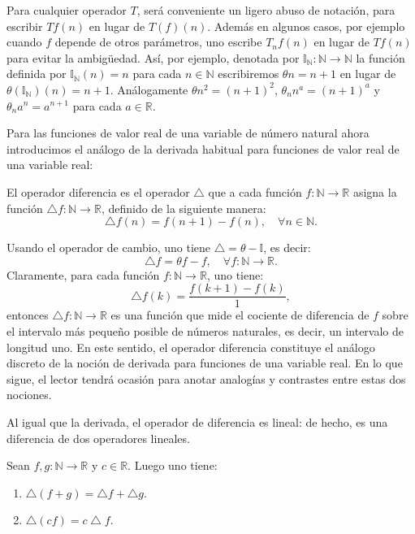 Para cualquier operador $T$, será conveniente un ligero abuso de notación, para escribir $Tf(n)$ en lugar de $T(f)(n)$. Además en algunos casos, por ejemplo cuando $f$ depende de otros parámetros, uno escribe $T_{n}f(n)$ en lugar de $Tf(n)$ para evitar la ambigüedad. Así, por ejemplo, denotada por $\mathds{I}_{\mathds{N}}\colon\mathds{N}\rightarrow\mathds{N}$ la función definida por $\mathds{I}_{\mathds{N}}(n)=n$ para cada $n\in\mathds{N} $ escribiremos $\theta n=n+1$ en lugar de $\theta(\mathds{I}_{\mathds{N}})(n)=n+1$. Análogamente $\theta n^{2}=(n+1)^{2}$, $\theta_{n}n^{a}=(n+1)^{a}$ y $\theta_{n}a^{n}=a^{n+1}$ para cada $a\in\mathds{R}$.

Para las funciones de valor real de una variable de número natural ahora introducimos el análogo de la derivada habitual para funciones de valor real de una variable real:

\begin{definition}
	El operador diferencia es el operador $\bigtriangleup$ que a cada función $f\colon\mathds{N}\rightarrow\mathds{R}$ asigna la función $\bigtriangleup f\colon\mathds{N}\rightarrow \mathds{R}$, definido de la siguiente manera: \[ \bigtriangleup f(n)=f(n+1)-f(n),\quad\forall n\in\mathds{N}. \]
\end{definition}

\begin{remark}
	Usando el operador de cambio, uno tiene $\bigtriangleup=\theta-\mathds{I}$, es decir: \[ \bigtriangleup f=\theta f-f,\quad\forall f\colon\mathds{N}\rightarrow\mathds{R}. \] Claramente, para cada función $f\colon\mathds{N}\rightarrow\mathds{R}$, uno tiene: \[ \bigtriangleup f(k)=\frac{f(k+1)-f(k)}{1}, \] entonces $\bigtriangleup f\colon\mathds{N}\rightarrow\mathds{R}$ es una función que mide el cociente de diferencia de $f$ sobre el intervalo más pequeño posible de números naturales, es decir, un intervalo de longitud uno. En este sentido, el operador diferencia constituye el análogo discreto de la noción de derivada para funciones de una variable real. En lo que sigue, el lector tendrá ocasión para anotar analogías y contrastes entre estas dos nociones.
\end{remark}

Al igual que la derivada, el operador de diferencia es lineal: de hecho, es una diferencia de dos operadores lineales.

\begin{proposition}
	Sean $ f,g\colon\mathds{N}\rightarrow\mathds{R}$ y $c\in\mathds{R}$. Luego uno tiene:
	\begin{enumerate}
		\item $\bigtriangleup\left(f+g\right)=\bigtriangleup f+\bigtriangleup g$.
		\item $\bigtriangleup(cf)=c\bigtriangleup f$.
	\end{enumerate}
\end{proposition}

